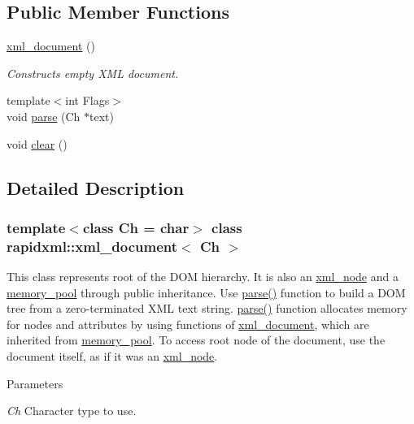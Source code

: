 \subsection*{Public Member Functions}
\begin{DoxyCompactItemize}
\item 
\hyperlink{classrapidxml_1_1xml__document_aae8841b15085ba8f32ff46587ace28f5}{xml\_\-document} ()
\begin{DoxyCompactList}\small\item\em Constructs empty XML document. \item\end{DoxyCompactList}\item 
{\footnotesize template$<$int Flags$>$ }\\void \hyperlink{classrapidxml_1_1xml__document_ad510b0c5fd8bf0180a55ffb2476e59e4}{parse} (Ch $\ast$text)
\item 
void \hyperlink{classrapidxml_1_1xml__document_a826929ff54242532198701f19ff5f83f}{clear} ()
\end{DoxyCompactItemize}


\subsection{Detailed Description}
\subsubsection*{template$<$class Ch = char$>$ class rapidxml::xml\_\-document$<$ Ch $>$}

This class represents root of the DOM hierarchy. It is also an \hyperlink{classrapidxml_1_1xml__node}{xml\_\-node} and a \hyperlink{classrapidxml_1_1memory__pool}{memory\_\-pool} through public inheritance. Use \hyperlink{classrapidxml_1_1xml__document_ad510b0c5fd8bf0180a55ffb2476e59e4}{parse()} function to build a DOM tree from a zero-\/terminated XML text string. \hyperlink{classrapidxml_1_1xml__document_ad510b0c5fd8bf0180a55ffb2476e59e4}{parse()} function allocates memory for nodes and attributes by using functions of \hyperlink{classrapidxml_1_1xml__document}{xml\_\-document}, which are inherited from \hyperlink{classrapidxml_1_1memory__pool}{memory\_\-pool}. To access root node of the document, use the document itself, as if it was an \hyperlink{classrapidxml_1_1xml__node}{xml\_\-node}. 
\begin{DoxyParams}{Parameters}
\item[{\em Ch}]Character type to use. \end{DoxyParams}


